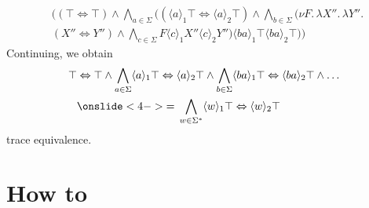 \begin{frame}
       \begin{align*}
        &\big( (\top \Leftrightarrow \top) \wedge
        \underset{a \in \Sigma}{\bigwedge} \big(
        (\langle a \rangle_1 \top \Leftrightarrow \langle a \rangle_2 \top) \wedge
        \underset{b \in \Sigma}{\bigwedge} \big(\nu F.\,
        \lambda X''.\, \lambda Y''.\, \\&(X'' \Leftrightarrow Y'') \wedge
        \underset{c \in \Sigma}{\bigwedge} F \langle c \rangle_1 X'' \langle c \rangle_2 Y''\big) \langle ba \rangle_1 \top \langle ba \rangle_2 \top \big)\big)
    \end{align*}
    Continuing, we obtain
       \begin{align*}
         \top &\Leftrightarrow \top \wedge \underset{a \in \Sigma}{\bigwedge} \langle a \rangle_1 \top \Leftrightarrow \langle a \rangle_2 \top \wedge \underset{b \in \Sigma}{\bigwedge}\langle ba \rangle_1 \top \Leftrightarrow \langle ba \rangle_2 \top \wedge \dots
        \\&
       \onslide<4->{ =\, \underset{w \in \Sigma^*}{\bigwedge} \langle w \rangle_1 \top \Leftrightarrow \langle w \rangle_2 \top}
    \end{align*}
    trace equivalence.
\end{frame}

\section{How to}

